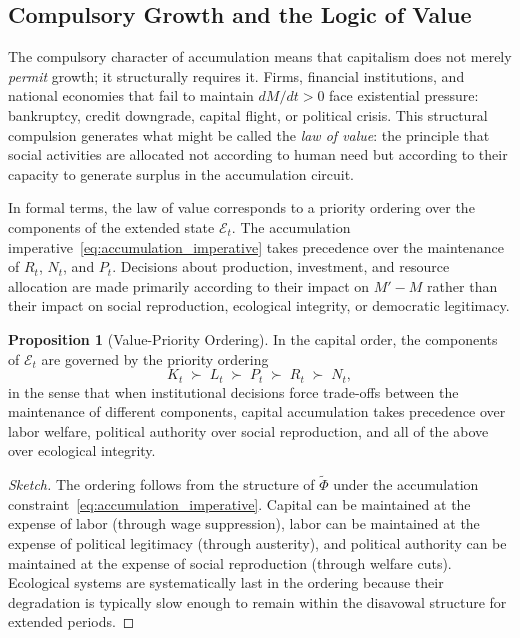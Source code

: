 \documentclass[12pt,a4paper]{article}
\theoremstyle{definition}
\newtheorem{proposition}{Proposition}[section]
\theoremstyle{remark}
\begin{document}
\subsection{Compulsory Growth and the Logic of Value}

The compulsory character of accumulation means that capitalism does not merely \emph{permit} growth; it structurally requires it. Firms, financial institutions, and national economies that fail to maintain $dM/dt > 0$ face existential pressure: bankruptcy, credit downgrade, capital flight, or political crisis. This structural compulsion generates what might be called the \emph{law of value}: the principle that social activities are allocated not according to human need but according to their capacity to generate surplus in the accumulation circuit.

In formal terms, the law of value corresponds to a priority ordering over the components of the extended state $\mathcal{E}_t$. The accumulation imperative~\eqref{eq:accumulation_imperative} takes precedence over the maintenance of $R_t$, $N_t$, and $P_t$. Decisions about production, investment, and resource allocation are made primarily according to their impact on $M' - M$ rather than their impact on social reproduction, ecological integrity, or democratic legitimacy.

\begin{proposition}[Value-Priority Ordering]
In the capital order, the components of $\mathcal{E}_t$ are governed by the priority ordering
\begin{equation}
  K_t \;\succ\; L_t \;\succ\; P_t \;\succ\; R_t \;\succ\; N_t,
\end{equation}
in the sense that when institutional decisions force trade-offs between the maintenance of different components, capital accumulation takes precedence over labor welfare, political authority over social reproduction, and all of the above over ecological integrity.
\end{proposition}

\begin{proof}[Sketch]
The ordering follows from the structure of $\tilde\Phi$ under the accumulation constraint~\eqref{eq:accumulation_imperative}. Capital can be maintained at the expense of labor (through wage suppression), labor can be maintained at the expense of political legitimacy (through austerity), and political authority can be maintained at the expense of social reproduction (through welfare cuts). Ecological systems are systematically last in the ordering because their degradation is typically slow enough to remain within the disavowal structure for extended periods.
\end{proof}
\end{document}

